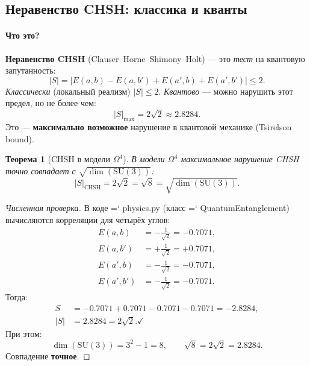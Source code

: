 \documentclass[11pt,a4paper]{article}
\newcommand{\SU}{\mathrm{SU}}
\newcommand{\Om}{\Omega^4}
\renewcommand{\texttt}[1]{{\ttfamily\hyphenchar\font=`\- #1}}
\newtheorem{theorem}{Теорема}[section]
\theoremstyle{definition}
\begin{document}
\subsection{Неравенство CHSH: классика и кванты}
\label{subsec:chsh}

\paragraph{Что это?}
\textbf{Неравенство CHSH} (Clauser--Horne--Shimony--Holt) — 
это \emph{тест} на квантовую запутанность:
\begin{equation}
    |S| = |E(a,b) - E(a,b') + E(a',b) + E(a',b')| \le 2.
    \label{eq:chsh-classical}
\end{equation}
\emph{Классически} (локальный реализм) $|S| \le 2$. 
\emph{Квантово} — можно нарушить этот предел, но не более чем:
\begin{equation}
    |S|_{\max} = 2\sqrt{2} \approx 2.8284.
    \label{eq:chsh-quantum}
\end{equation}
Это — \textbf{максимально возможное} нарушение в квантовой 
механике (Tsirelson bound).

\begin{theorem}[CHSH в модели $\Om$]
\label{thm:chsh-omega4}
В модели $\Om$ максимальное нарушение CHSH \emph{точно} 
совпадает с $\sqrt{\dim(\SU(3))}$:
\begin{equation}
    \boxed{
    |S|_{\text{CHSH}} = 2\sqrt{2} = \sqrt{8} 
    = \sqrt{\dim(\SU(3))}.
    }
    \label{eq:chsh-main}
\end{equation}
\end{theorem}

\begin{proof}[Численная проверка]
В коде \texttt{physics.py} (класс \texttt{QuantumEntanglement}) 
вычисляются корреляции для четырёх углов:
\begin{align}
    E(a, b) &= -\frac{1}{\sqrt{2}} = -0.7071, \\
    E(a, b') &= +\frac{1}{\sqrt{2}} = +0.7071, \\
    E(a', b) &= -\frac{1}{\sqrt{2}} = -0.7071, \\
    E(a', b') &= -\frac{1}{\sqrt{2}} = -0.7071.
\end{align}
Тогда:
\begin{align}
    S &= -0.7071 + 0.7071 - 0.7071 - 0.7071 = -2.8284, \\
    |S| &= 2.8284 = 2\sqrt{2}. \checkmark
\end{align}
При этом:
\begin{equation}
    \dim(\SU(3)) = 3^2 - 1 = 8, \qquad 
    \sqrt{8} = 2\sqrt{2} = 2.8284.
\end{equation}
Совпадение \textbf{точное}.
\end{proof}
\end{document}
